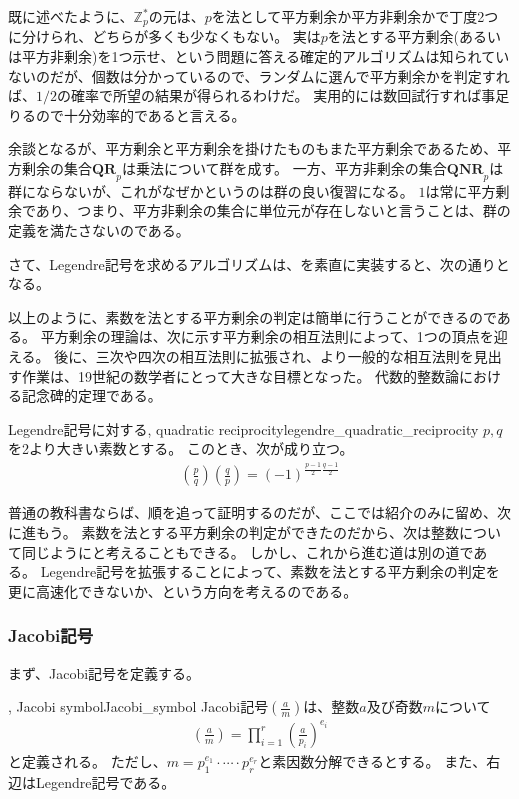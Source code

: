 既に述べたように、$\mathbb{Z}_p^*$の元は、$p$を法として平方剰余か平方非剰余かで丁度2つに分けられ、どちらが多くも少なくもない。
実は$p$を法とする平方剰余(あるいは平方非剰余)を1つ示せ、という問題に答える確定的アルゴリズムは知られていないのだが、個数は分かっているので、ランダムに選んで平方剰余かを判定すれば、$1/2$の確率で所望の結果が得られるわけだ。
実用的には数回試行すれば事足りるので十分効率的であると言える。

余談となるが、平方剰余と平方剰余を掛けたものもまた平方剰余であるため、平方剰余の集合$\mathbf{QR}_p$は乗法について群を成す。
一方、平方非剰余の集合$\mathbf{QNR}_p$は群にならないが、これがなぜかというのは群の良い復習になる。
$1$は常に平方剰余であり、つまり、平方非剰余の集合に単位元が存在しないと言うことは、群の定義を満たさないのである。

さて、Legendre記号を求めるアルゴリズムは、を素直に実装すると、次の通りとなる。


以上のように、素数を法とする平方剰余の判定は簡単に行うことができるのである。
平方剰余の理論は、次に示す平方剰余の相互法則によって、1つの頂点を迎える。
後に、三次や四次の相互法則に拡張され、より一般的な相互法則を見出す作業は、19世紀の数学者にとって大きな目標となった。
代数的整数論における記念碑的定理である。

\begin{Theo}{Legendre記号に対する, quadratic reciprocity}{legendre_quadratic_reciprocity}
$p,q$を2より大きい素数とする。
このとき、次が成り立つ。
\begin{align*}
\left(\frac{p}{q}\right)\left(\frac{q}{p}\right) = (-1)^{\frac{p-1}{2}\frac{q-1}{2}}
\end{align*}
\end{Theo}

普通の教科書ならば、順を追って証明するのだが、ここでは紹介のみに留め、次に進もう。
素数を法とする平方剰余の判定ができたのだから、次は整数について同じようにと考えることもできる。
しかし、これから進む道は別の道である。
Legendre記号を拡張することによって、素数を法とする平方剰余の判定を更に高速化できないか、という方向を考えるのである。

\subsubsection{Jacobi記号}
まず、Jacobi記号を定義する。

\begin{Defi}{, Jacobi symbol}{Jacobi_symbol}
Jacobi記号$\left(\frac{a}{m}\right)$は、整数$a$及び奇数$m$について
\begin{align*}
\left(\frac{a}{m}\right) = \prod_{i = 1}^r \left(\frac{a}{p_i}\right)^{e_i}
\end{align*}
と定義される。
ただし、$m=p_1^{e_1}\cdot\cdots\cdot p_r^{e_r}$と素因数分解できるとする。
また、右辺はLegendre記号である。
\end{Defi}

